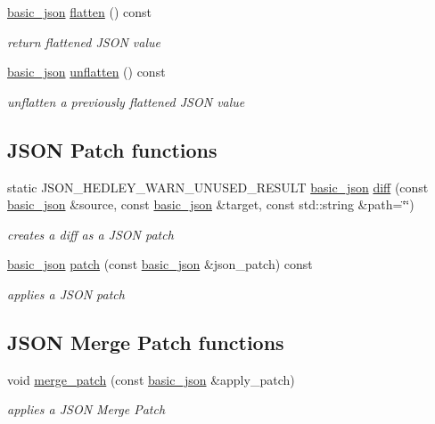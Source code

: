 \begin{DoxyCompactItemize}
\mbox{\hyperlink{classnlohmann_1_1basic__json}{basic\+\_\+json}} \mbox{\hyperlink{classnlohmann_1_1basic__json_ab838f000d76662917ffd6ec529569e03}{flatten}} () const
\begin{DoxyCompactList}\small\item\em return flattened J\+S\+ON value \end{DoxyCompactList}\item 
\mbox{\hyperlink{classnlohmann_1_1basic__json}{basic\+\_\+json}} \mbox{\hyperlink{classnlohmann_1_1basic__json_a74fa3ab2003f2f6f2b69deaafed9126d}{unflatten}} () const
\begin{DoxyCompactList}\small\item\em unflatten a previously flattened J\+S\+ON value \end{DoxyCompactList}\end{DoxyCompactItemize}
\subsection*{J\+S\+ON Patch functions}
\begin{DoxyCompactItemize}
\item 
static J\+S\+O\+N\+\_\+\+H\+E\+D\+L\+E\+Y\+\_\+\+W\+A\+R\+N\+\_\+\+U\+N\+U\+S\+E\+D\+\_\+\+R\+E\+S\+U\+LT \mbox{\hyperlink{classnlohmann_1_1basic__json}{basic\+\_\+json}} \mbox{\hyperlink{classnlohmann_1_1basic__json_a9c4f3554773649beef69461a10a3de87}{diff}} (const \mbox{\hyperlink{classnlohmann_1_1basic__json}{basic\+\_\+json}} \&source, const \mbox{\hyperlink{classnlohmann_1_1basic__json}{basic\+\_\+json}} \&target, const std\+::string \&path=\char`\"{}\char`\"{})
\begin{DoxyCompactList}\small\item\em creates a diff as a J\+S\+ON patch \end{DoxyCompactList}\item 
\mbox{\hyperlink{classnlohmann_1_1basic__json}{basic\+\_\+json}} \mbox{\hyperlink{classnlohmann_1_1basic__json_a81e0c41a4a9dff4df2f6973f7f8b2a83}{patch}} (const \mbox{\hyperlink{classnlohmann_1_1basic__json}{basic\+\_\+json}} \&json\+\_\+patch) const
\begin{DoxyCompactList}\small\item\em applies a J\+S\+ON patch \end{DoxyCompactList}\end{DoxyCompactItemize}
\subsection*{J\+S\+ON Merge Patch functions}
\begin{DoxyCompactItemize}
\item 
void \mbox{\hyperlink{classnlohmann_1_1basic__json_a7c43ed2a3004c1fa9543913f37b9fca9}{merge\+\_\+patch}} (const \mbox{\hyperlink{classnlohmann_1_1basic__json}{basic\+\_\+json}} \&apply\+\_\+patch)
\begin{DoxyCompactList}\small\item\em applies a J\+S\+ON Merge Patch \end{DoxyCompactList}\end{DoxyCompactItemize}


